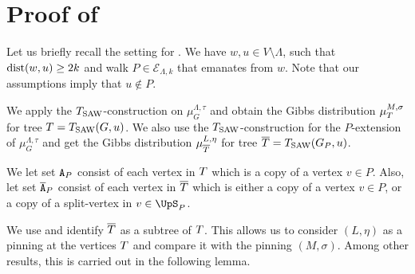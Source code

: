 \documentclass[11pt,reqno]{amsart}
\numberwithin{equation}{section}
\newcommand{\cE}{{\mathcal{E}}}
\newcommand{\blue}[1]{{\color{blue}#1}}
\newcommand{\bluepigment}[1]{{\color{blue(pigment)}#1}}
\newcommand{\cadmiumorange}[1]{{\color{cadmiumorange}#1}}
\newcommand{\electricviolet}[1]{{\color{electricviolet}#1}}
\newcommand{\goldenbrown}[1]{{\color{goldenbrown}#1}}
\newcommand{\iris}[1]{{\color{iris}#1}}
\newcommand{\red}[1]{{\color{red}#1}}
\newcommand{\dist}{{\rm dist}}
\newcommand{\ExtV}{\iris{\cE}}
\newcommand{\Tsaw}{T_{\rm SAW}}
\newcommand{\spreadpoint}{\newpage}
\newcommand{\LastReviewG}[1]{{\color{magenta}\hspace{.2cm} [Rev: \textrm{#1} - \bluepigment{G} ] \hspace{.2cm}}}
\renewcommand{\LastReviewG}[1]{}
\renewcommand{\spreadpoint}{}
\renewcommand{\blue}[1]{#1}
\renewcommand{\bluepigment}[1]{#1}
\renewcommand{\cadmiumorange}[1]{#1}
\renewcommand{\electricviolet}[1]{#1}
\renewcommand{\goldenbrown}[1]{#1}
\renewcommand{\iris}[1]{#1}
\renewcommand{\red}[1]{#1}
\newcommand{\kk}{\bluepigment{k}}
\newcommand{\kL}{\cadmiumorange{L}}
\newcommand{\kP}{\goldenbrown{P}}
\newcommand{\ku}{\red{u}}
\newcommand{\kv}{\electricviolet{v}}
\newcommand{\kw}{\blue{w}}
\renewcommand{\kk}{k}
\renewcommand{\kL}{L}
\renewcommand{\kP}{P}
\renewcommand{\ku}{u}
\renewcommand{\kv}{v}
\renewcommand{\kw}{w}
\begin{document}
\spreadpoint

\section{Proof of  \LastReviewG{2025-03-04}}\label{sec:thrm:ProdWideHatBetaVsBeta}

Let us briefly recall the setting for .  We have $\kw, \ku\in V\setminus \Lambda$, 
such that $\dist(\kw,\ku)\geq 2\kk$ and  walk $\kP\in \ExtV_{\Lambda,\kk}$ that emanates from $\kw$. Note that our assumptions imply
that  $\ku\notin \kP$. 


We apply the $\Tsaw$-construction on $\mu^{\Lambda,\tau}_G$ and  obtain the Gibbs distribution $\mu^{M,\sigma}_{T}$ 
for tree $\SMTu=\Tsaw(G,\ku)$.   We also use the $\Tsaw$-construction for the $\kP$-extension of $\mu^{\Lambda,\tau}_G$ 
and get  the Gibbs distribution $\mu^{\kL,\eta}_{\SMTPu}$ for tree $\SMTPu=\Tsaw(\gext{G}{\kP},\ku)$. 



We let set $\cpT$ consist of each vertex in $T$ which is a copy of a vertex $\kv\in P$. Also, let set $\cpTP$ 
consist of each vertex in $\overline{T}$ which is either a copy of a vertex $\kv\in \kP$, or  a copy of a split-vertex in $\kv\in \ssplit_{\kP}$. 



We use  and identify $\overline{T}$ as a subtree of $T$. This allows us to consider  $(\kL, \eta)$ as a pinning 
at the vertices $T$ and compare it with the pinning $(M,\sigma)$.  Among other results, this is carried out in  the following lemma.
 
\end{document}

